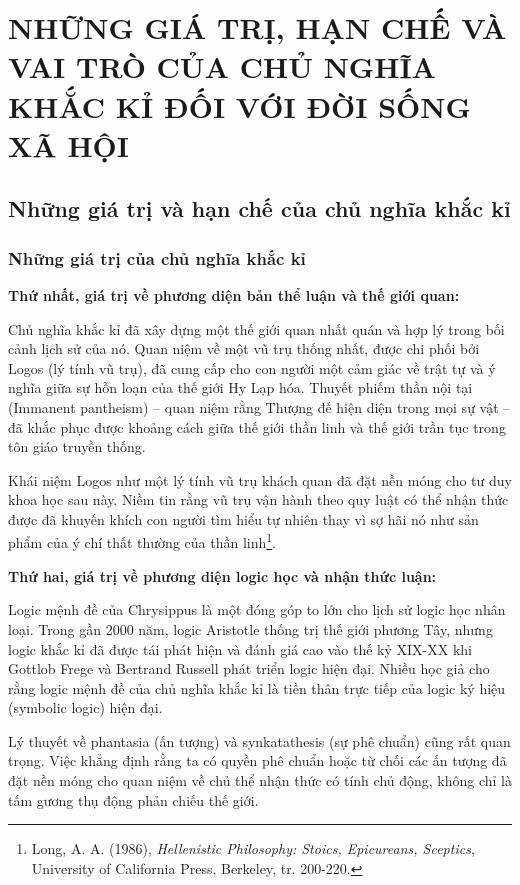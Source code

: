 \section{NHỮNG GIÁ TRỊ, HẠN CHẾ VÀ VAI TRÒ CỦA CHỦ NGHĨA KHẮC KỈ ĐỐI VỚI ĐỜI SỐNG XÃ HỘI}

\subsection{Những giá trị và hạn chế của chủ nghĩa khắc kỉ}

\subsubsection{Những giá trị của chủ nghĩa khắc kỉ}

\textbf{Thứ nhất, giá trị về phương diện bản thể luận và thế giới quan:}

Chủ nghĩa khắc kỉ đã xây dựng một thế giới quan nhất quán và hợp lý trong bối cảnh lịch sử của nó. Quan niệm về một vũ trụ thống nhất, được chi phối bởi Logos (lý tính vũ trụ), đã cung cấp cho con người một cảm giác về trật tự và ý nghĩa giữa sự hỗn loạn của thế giới Hy Lạp hóa. Thuyết phiếm thần nội tại (Immanent pantheism) – quan niệm rằng Thượng đế hiện diện trong mọi sự vật – đã khắc phục được khoảng cách giữa thế giới thần linh và thế giới trần tục trong tôn giáo truyền thống.

Khái niệm Logos như một lý tính vũ trụ khách quan đã đặt nền móng cho tư duy khoa học sau này. Niềm tin rằng vũ trụ vận hành theo quy luật có thể nhận thức được đã khuyến khích con người tìm hiểu tự nhiên thay vì sợ hãi nó như sản phẩm của ý chí thất thường của thần linh\footnote{Long, A. A. (1986), \textit{Hellenistic Philosophy: Stoics, Epicureans, Sceptics}, University of California Press, Berkeley, tr. 200-220.}.

\textbf{Thứ hai, giá trị về phương diện logic học và nhận thức luận:}

Logic mệnh đề của Chrysippus là một đóng góp to lớn cho lịch sử logic học nhân loại. Trong gần 2000 năm, logic Aristotle thống trị thế giới phương Tây, nhưng logic khắc kỉ đã được tái phát hiện và đánh giá cao vào thế kỷ XIX-XX khi Gottlob Frege và Bertrand Russell phát triển logic hiện đại. Nhiều học giả cho rằng logic mệnh đề của chủ nghĩa khắc kỉ là tiền thân trực tiếp của logic ký hiệu (symbolic logic) hiện đại.

Lý thuyết về phantasia (ấn tượng) và synkatathesis (sự phê chuẩn) cũng rất quan trọng. Việc khẳng định rằng ta có quyền phê chuẩn hoặc từ chối các ấn tượng đã đặt nền móng cho quan niệm về chủ thể nhận thức có tính chủ động, không chỉ là tấm gương thụ động phản chiếu thế giới.

